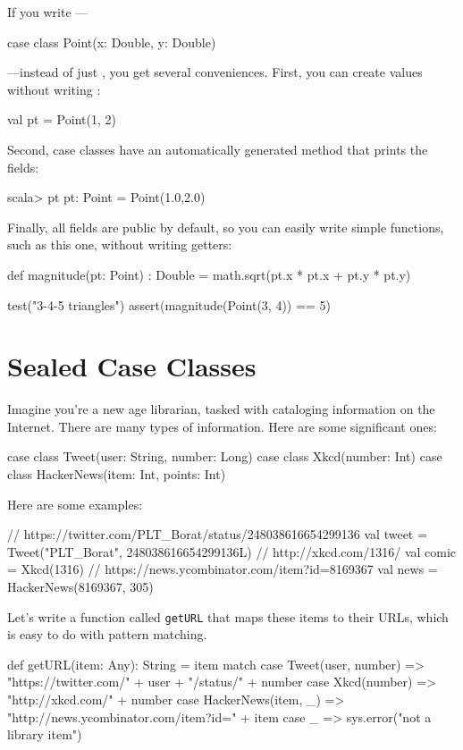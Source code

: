 \documentclass[9pt]{extbook}
\begin{document}
If you write ---
%
\begin{scalacode}
case class Point(x: Double, y: Double)
\end{scalacode}
---instead of just , you get several conveniences.
First, you can create values without writing :
%
\begin{scalacode}
val pt = Point(1, 2)
\end{scalacode}
%
Second, case classes have an automatically generated 
method that prints the fields:
%
\begin{console}
scala> pt
pt: Point = Point(1.0,2.0)
\end{console}
%
Finally, all fields are public by default, so you can easily write simple
functions, such as this one, without writing getters:
%
\begin{scalacode}
def magnitude(pt: Point) : Double = {
  math.sqrt(pt.x * pt.x + pt.y * pt.y)
}

test("3-4-5 triangles") {
  assert(magnitude(Point(3, 4)) == 5)
}
\end{scalacode}

\section{Sealed Case Classes}

Imagine you're a new age librarian, tasked with cataloging information on the
Internet. There are many types of information. Here are some significant ones:

\begin{scalacode}
case class Tweet(user: String, number: Long)
case class Xkcd(number: Int)
case class HackerNews(item: Int, points: Int)
\end{scalacode}

Here are some examples:

\begin{scalacode}
// https://twitter.com/PLT_Borat/status/248038616654299136
val tweet = Tweet("PLT_Borat", 248038616654299136L)
// http://xkcd.com/1316/
val comic = Xkcd(1316)
// https://news.ycombinator.com/item?id=8169367
val news = HackerNews(8169367, 305)
\end{scalacode}

Let's write a function called \verb|getURL| that maps these items to their URLs,
which is easy to do with pattern matching.

\begin{scalacode}
def getURL(item: Any): String = item match {
  case Tweet(user, number) => "https://twitter.com/" + user + "/status/" + number
  case Xkcd(number) => "http://xkcd.com/" + number
  case HackerNews(item, _) => "http://news.ycombinator.com/item?id=" + item
  case _ => sys.error("not a library item")
}
\end{scalacode}
\end{document}
